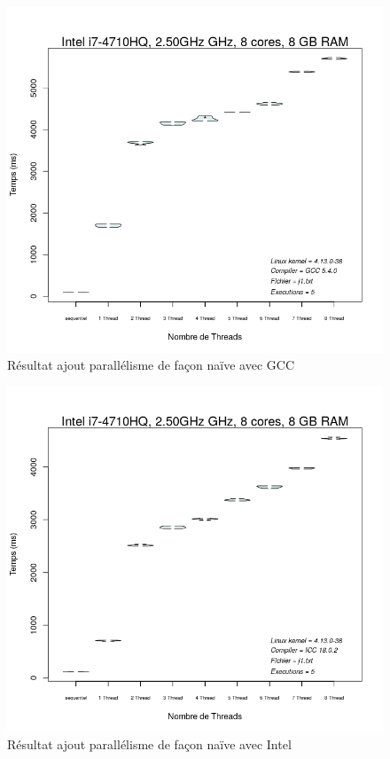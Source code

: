 \documentclass[
 aip,
 jmp,
 amsmath,amssymb,
 reprint
]{revtex4-1}
\begin{document}
\begin{figure}[H]
  \includegraphics[width=\linewidth, keepaspectratio=true]{gcc_parallel_naif.png}
  \caption{Résultat ajout parallélisme de façon naïve avec GCC\label{Fig:gcc_naif}}
\end{figure}

\begin{figure}[H]
  \includegraphics[width=\linewidth, keepaspectratio=true]{intel_parallel_naif.png}
  \caption{Résultat ajout parallélisme de façon naïve avec Intel\label{Fig:intel_naif}}
\end{figure}
\end{document}
